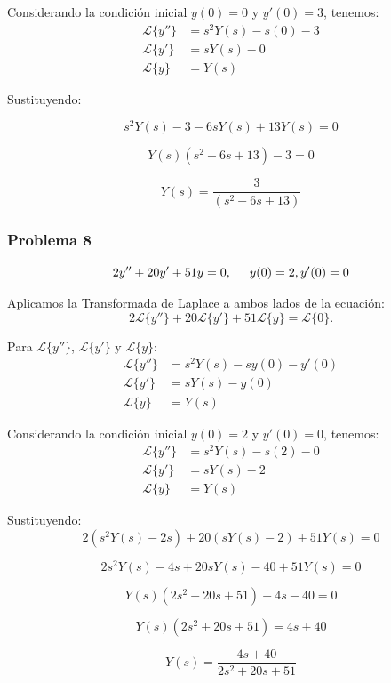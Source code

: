 \documentclass{article}
\begin{document}
Considerando la condición inicial $y(0) = 0$ y $y'(0) = 3$, tenemos:
\begin{align*}
    \mathcal{L}\{y''\} & = s^2Y(s) - s(0) - 3 \\
    \mathcal{L}\{y'\}  & = sY(s) - 0          \\
    \mathcal{L}\{y\}   & = Y(s)
\end{align*}

Sustituyendo:

\[
    s^2Y(s) - 3 - 6sY(s) + 13Y(s) = 0
\]

\[
    Y(s)(s^2 - 6s + 13) - 3 = 0
\]

\[
    Y(s) = \frac{3}{(s^2 - 6s + 13)}
\]

\newpage

\subsubsection{Problema 8}
\[2y'' + 20y' + 51y = 0, \hspace{.5cm} y(0) = 2, y'(0) = 0\]

Aplicamos la Transformada de Laplace a ambos lados de la ecuación:
\[
    2\mathcal{L}\{y''\} + 20\mathcal{L}\{y'\} + 51\mathcal{L}\{y\} = \mathcal{L}\{0\}.
\]

Para \(\mathcal{L}\{y''\}\), \(\mathcal{L}\{y'\}\) y \(\mathcal{L}\{y\}\):
\begin{align*}
    \mathcal{L}\{y''\} & = s^2Y(s) - sy(0) - y'(0) \\
    \mathcal{L}\{y'\}  & = sY(s) - y(0)            \\
    \mathcal{L}\{y\}   & = Y(s)
\end{align*}

Considerando la condición inicial $y(0) = 2$ y $y'(0) = 0$, tenemos:
\begin{align*}
    \mathcal{L}\{y''\} & = s^2Y(s) - s(2) - 0 \\
    \mathcal{L}\{y'\}  & = sY(s) - 2          \\
    \mathcal{L}\{y\}   & = Y(s)
\end{align*}

Sustituyendo:
\[
    2(s^2Y(s) - 2s) + 20(sY(s) - 2) + 51Y(s) = 0
\]

\[
    2s^2Y(s) - 4s + 20sY(s) - 40 + 51Y(s) = 0
\]

\[
    Y(s)(2s^2 + 20s + 51) - 4s - 40 = 0
\]

\[
    Y(s)(2s^2 + 20s + 51) = 4s + 40
\]

\[
    Y(s) = \frac{4s + 40}{2s^2 + 20s + 51}
\]
\end{document}
